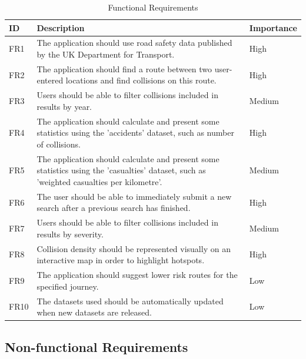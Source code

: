 \documentclass[authoryearcitations]{UoYCSproject}
\begin{document}
\begin{table}[tbp]
\caption{Functional Requirements}
\begin{tabular}{| p{1.5cm} | p{7.5cm} | p{2cm} |}
	\hline
	\textbf{ID} & \textbf{Description} & \textbf{Importance} \\ \hline
	FR1 & The application should use road safety data published by the UK Department for Transport. & High \\ \hline
	FR2 & The application should find a route between two user-entered locations and find collisions on this route. & High \\ \hline
	FR3 & Users should be able to filter collisions included in results by year. & Medium \\ \hline
	FR4 & The application should calculate and present some statistics using the 'accidents' dataset, such as number of collisions. & High \\ \hline
	FR5 & The application should calculate and present some statistics using the 'casualties' dataset, such as 'weighted casualties per kilometre'. & Medium \\ \hline
	FR6 & The user should be able to immediately submit a new search after a previous search has finished. & High \\ \hline
	FR7 & Users should be able to filter collisions included in results by severity. & Medium \\ \hline
	FR8 & Collision density should be represented visually on an interactive map in order to highlight hotspots. & High \\ \hline
	FR9 & The application should suggest lower risk routes for the specified journey. & Low \\ \hline
	FR10 & The datasets used should be automatically updated when new datasets are released. & Low \\ \hline
\end{tabular}
\label{tab:FunctionalReqs}
\end{table}

\subsection{Non-functional Requirements}
\end{document}
